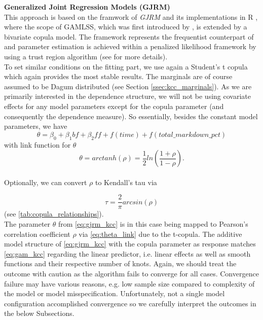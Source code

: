 

\textbf{Generalized Joint Regression Models (GJRM)}\\
This approach is based on the framwork of \textit{\ac{GJRM}} and its implementations in R \citep{marra1605bivariate, marragjrm}, where the scope of \ac{GAMLSS}, which was first introduced by \cite{rigby2005generalized}, is extended by a bivariate copula model. The framework represents the frequentist counterpart of \cite{klein2016simultaneous} and parameter estimation is achieved within a penalized likelihood framework by using a trust region algorithm (see \cite{marragjrm} for more details). \\

To set similar conditions on the fitting part, we use again a Student's t copula which again provides the most stable results. The marginals are of course assumed to be Dagum distributed (see Section \ref{ssec:kcc_marginals}). As we are primarily interested in the dependence structure, we will not be using covariate effects for any model parameters except for the copula parameter (and consequently the dependence measure). 
So essentially, besides the constant model parameters, we have 
\begin{equation}
\theta = \beta_0 + \beta_1 \textit{bf} + \beta_2 \textit{ff} + f(\textit{time}) + f(\textit{total\_markdown\_pct})
\label{eq:gjrm_kcc}
\end{equation}
with link function for $\theta$ 
\begin{equation}
\theta = arctanh(\rho) = \frac{1}{2} ln (\frac{1 + \rho}{1 - \rho}).
\label{eq:theta_link}
\end{equation}\\

Optionally, we can convert $\rho$ to Kendall's tau via

$$
\tau = \frac{2}{\pi}arcsin(\rho)
$$
(see \autoref{tab:copula_relationships}). \\

The parameter $\theta$ from \autoref{eq:gjrm_kcc} is in this case being mapped to Pearson's correlation coefficient $\rho$ via \autoref{eq:theta_link} due to the t-copula. The additive model structure of \autoref{eq:gjrm_kcc} with the copula parameter as response matches \autoref{eq:gam_kcc} regarding the linear predictor, i.e. linear effects as well as smooth functions and their respective number of knots. Again, we should treat the outcome with caution as the algorithm fails to converge for all cases. Convergence failure may have various reasons, e.g. low sample size compared to complexity of the model or model misspecification. Unfortunately, not a single model configuration accomplished convergence so we carefully interpret the outcomes in the below Subsections.


